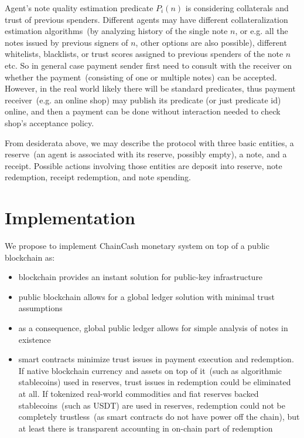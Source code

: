 \documentclass{llncs}   %
\newcommand{\cc}{ChainCash}
\begin{document}
Agent's note quality estimation predicate $P_i(n)$ is considering collaterals and trust of previous spenders. Different agents may have different 
collateralization estimation algorithms~(by analyzing history of the single note $n$, or e.g. all the notes issued by previous signers of $n$, other options are also possible), different whitelists, blacklists, or trust scores assigned to previous spenders of the note $n$ etc. So in general case payment sender first need to consult with the receiver on whether the payment~(consisting of one or multiple notes) can be accepted. However, in the real world likely there will be standard predicates, thus payment receiver~(e.g. an online shop) may publish its predicate (or just predicate id) online, and then a payment can be done without interaction needed to check shop's acceptance policy.

From desiderata above, we may describe the protocol with three basic entities, a reserve~(an agent is associated with its
reserve, possibly empty), a note, and a receipt. Possible actions involving those entities are deposit into reserve, note redemption,
 receipt redemption, and note spending.

\section{Implementation}
\label{sec-impl}

We propose to implement \cc{} monetary system on top of a public blockchain as:

\begin{itemize}
  \item{} blockchain provides an instant solution for public-key infrastructure
  \item{} public blockchain allows for a global ledger solution with minimal trust assumptions~\cite{kya}
  \item{} as a consequence, global public ledger allows for simple analysis of notes in existence
  \item{} smart contracts minimize trust issues in payment execution and redemption. If native blockchain currency and assets on top of it~(such as algorithmic stablecoins) used in reserves, trust issues in redemption could be eliminated at all. If tokenized real-world commodities and fiat reserves backed stablecoins~(such as USDT) are used in reserves, redemption could not be completely trustless~(as smart contracts do not have power off the chain), but at least there is transparent accounting in on-chain part of redemption
\end{itemize}
\end{document}
